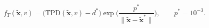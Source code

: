 \documentclass[11pt]{article}
\begin{document}
\begin{equation}
f_T(\tilde{\boldsymbol x}, v) = \big(\mathrm{TPD}(\tilde{\boldsymbol x}, v) - d^{*}\big)\exp\!\Big(\frac{p^{*}}{\|\tilde{\boldsymbol x} - \tilde{\boldsymbol x}^{*}\|}\Big),\qquad p^{*} = 10^{-3}.
\label{eq:tunneling_transform}
\end{equation}

\printbibliography
\end{document}
